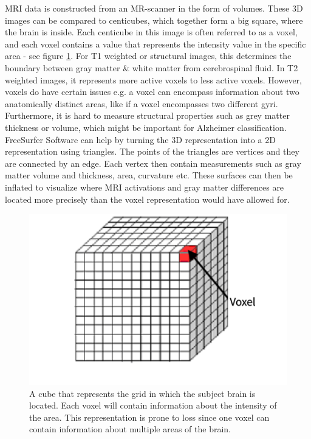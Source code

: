 \documentclass[12pt, fleqn, titlepage]{article}
\begin{document}
MRI data is constructed from an MR-scanner in the form of volumes. These 3D images can be compared to centicubes, which together form a big square, where the brain is inside. Each centicube in this image is often referred to as a voxel, and each voxel contains a value that represents the intensity value in the specific area - see figure \ref{fig:voxel}. For T1 weighted or structural images, this determines the boundary between gray matter \& white matter from cerebrospinal fluid. In T2 weighted images, it represents more active voxels to  less active voxels. However, voxels do have certain issues e.g. a voxel can encompass information about two anatomically distinct areas, like if a voxel encompasses two different gyri. Furthermore, it is hard to measure structural properties such as grey matter thickness or volume, which might be important for Alzheimer classification. FreeSurfer Software can help by turning the 3D representation into a 2D representation using triangles. The points of the triangles are vertices and they are connected by an edge. Each vertex then contain measurements such as gray matter volume and thickness, area, curvature etc. These surfaces can then be inflated to visualize where MRI activations and gray matter differences are located more precisely than the voxel representation would have allowed for. 

\begin{figure}[H]
	\centering
	\includegraphics[width=0.6\linewidth]{imgs/voxel}
	\caption{A cube that represents the grid in which the subject brain is located. Each voxel will contain information about the intensity of the area. This representation is prone to loss since one voxel can contain information about multiple areas of the brain.}
	\label{fig:voxel}
\end{figure}
\end{document}
